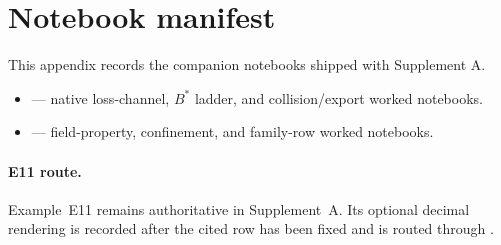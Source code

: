 \section{Notebook manifest}
This appendix records the companion notebooks shipped with Supplement A.\par
\begin{itemize}
\item {} --- native loss-channel, $B^*$ ladder, and collision/export worked notebooks.
\item {} --- field-property, confinement, and family-row worked notebooks.
\end{itemize}
\paragraph{E11 route.} Example~E11 remains authoritative in Supplement~A. Its optional decimal rendering is recorded after the cited row has been fixed and is routed through .
